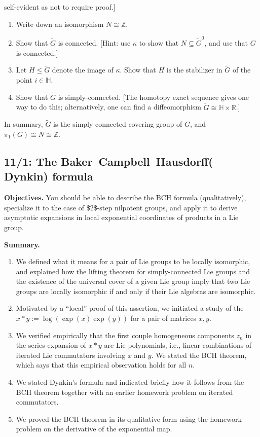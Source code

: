 \documentclass[reqno]{amsart} 
\begin{document}
\begin{homework}
\begin{enumerate}
    self-evident as not to require proof.]
    \begin{enumerate}
    \item Write down an isomorphism $N \cong \mathbb{Z}$.
    \item Show that $\tilde{G}$ is connected.
      [Hint: use $\kappa$ to show that $N \subseteq \tilde{G}^0$,
      and use
      that $G$ is connected.]
    \item
      Let $H \leq \tilde{G}$ denote the image of $\kappa$.
      Show that $H$ is the stabilizer in $\tilde{G}$
      of the point $i \in \mathbb{H}$.
    \item Show that $\tilde{G}$ is simply-connected.
      [The homotopy exact sequence gives one way to do this;
      alternatively, one can find a diffeomorphism
      $\tilde{G} \cong \mathbb{H} \times \mathbb{R}$.]
    \end{enumerate}
    In summary,
    $\tilde{G}$ is the simply-connected covering group of $G$,
    and $\pi_1(G) \cong N \cong \mathbb{Z}$.
  \end{enumerate}
\end{homework}

\newpage
\subsection{11/1: The Baker--Campbell--Hausdorff(--Dynkin) formula}
\label{sec:orged45fdb}
\textbf{Objectives.} You should be able to describe the BCH formula
(qualitatively), specialize it to the case of \$2\$-step nilpotent groups, and
apply it to derive asymptotic expansions in local exponential
coordinates of products in a Lie group.

\textbf{Summary.}
\begin{enumerate}
\item We defined what it means for a pair of Lie groups to be locally
isomorphic, and explained how the lifting theorem for
simply-connected Lie groups and the existence of the universal
cover of a given Lie group imply that two Lie groups are locally
isomorphic if and only if their Lie algebras are isomorphic.
\item Motivated by a ``local'' proof of this assertion, we initiated a
study of the \(x \ast y := \log(\exp(x) \exp(y))\) for a pair of
matrices \(x,y\).
\item We verified empirically that the first couple homogeneous
components \(z_n\) in the series expansion of \(x \ast y\) are Lie
polynomials, i.e., linear combinations of iterated Lie commutators
involving \(x\) and \(y\).  We stated the BCH theorem, which says that
this empirical observation holds for all \(n\).
\item We stated Dynkin's formula and indicated briefly how it follows
from the BCH theorem together with an earlier homework problem on
iterated commutators.
\item We proved the BCH theorem in its qualitative form using the
homework problem on the derivative of the exponential map.
\end{enumerate}
\end{document}
